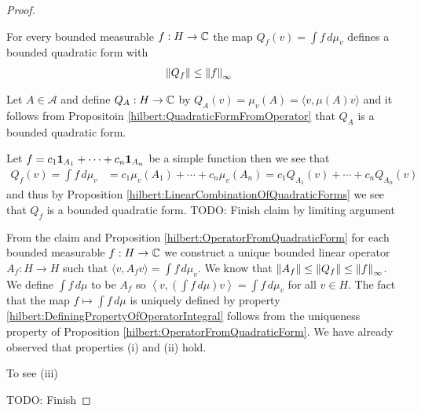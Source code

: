 \begin{proof}

\begin{clm}For every bounded measurable $f : H \to \mathbb{C}$ the map $Q_f(v) = \int f \, d\mu_v$ defines a bounded quadratic form with 
\begin{align*}
\left \lVert Q_f \right \rVert &\leq \left \lVert f \right \rVert_\infty
\end{align*}
\end{clm}
Let $A \in \mathcal{A}$ and define $Q_A : H \to \mathbb{C}$ by $Q_A(v) = \mu_v(A) = \langle v , \mu(A) v \rangle$ and it follows from Propositoin \ref{hilbert:QuadraticFormFromOperator} that $Q_A$ is a bounded quadratic form.

Let $f = c_1 \textbf{1}_{A_1} + \dotsb + c_n \textbf{1}_{A_n}$ be a simple function then we see that 
\begin{align*}
Q_f(v) = \int f \, d\mu_v &= c_1 \mu_v(A_1) +  \dotsb + c_n \mu_v(A_n) =  c_1 Q_{A_1}(v) +  \dotsb + c_n Q_{A_n}(v) 
\end{align*}
and thus by Proposition \ref{hilbert:LinearCombinationOfQuadraticForms} we see that $Q_f$ is a bounded quadratic form.  TODO: Finish claim by limiting argument

From the claim and Proposition  \ref{hilbert:OperatorFromQuadraticForm} for each bounded measurable $f : H \to \mathbb{C}$ we construct a unique bounded linear operator $A_f : H \to H$ such that
$\langle v, A_f v \rangle = \int f \, d \mu_v$.  We know that $\left \lVert A_f \right \rVert \leq \left \lVert Q_f \right \rVert \leq \left \lVert f \right \rVert_\infty$.  We define $\int f \, d\mu$ to be $A_f$ so $\left \langle v, \left(\int f \, d\mu \right) v \right \rangle = \int f \, d\mu_v$ for all $v \in H$.  The fact that the map $f \mapsto \int f \, d\mu$ is uniquely defined by property \eqref{hilbert:DefiningPropertyOfOperatorIntegral} follows from the uniqueness property of Proposition  \ref{hilbert:OperatorFromQuadraticForm}.  We have already observed that properties (i) and (ii) hold.  

To see (iii)

TODO: Finish
\end{proof}

